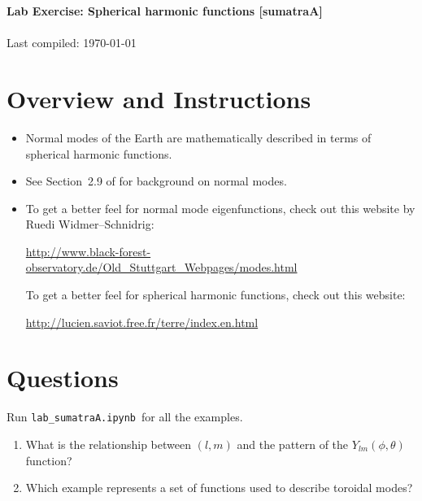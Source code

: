 \documentclass[11pt,titlepage,fleqn]{article}
\newcommand{\tfile}{{\tt lab_sumatraA.ipynb}}
\begin{document}

\begin{spacing}{1.2} 
\centering
{\large \bf Lab Exercise: Spherical harmonic functions [sumatraA]} \\
\cltag\ \\
Last compiled: \today
\end{spacing}

\section{Overview and Instructions}

\begin{itemize}
\item Normal modes of the Earth are mathematically described in terms of spherical harmonic functions.

\item See Section~2.9 of \citet{SteinWysession} for background on normal modes.

\item To get a better feel for normal mode eigenfunctions, check out this website by Ruedi Widmer--Schnidrig:

\url{http://www.black-forest-observatory.de/Old_Stuttgart_Webpages/modes.html}

To get a better feel for spherical harmonic functions, check out this website:

\url{http://lucien.saviot.free.fr/terre/index.en.html}

\end{itemize}


\section{Questions}

Run \tfile\ for all the examples.

\begin{enumerate}
\item What is the relationship between $(l,m)$ and the pattern of the $Y_{lm}(\phi,\theta)$ function?

\vspace{1cm}

\item Which example represents a set of functions used to describe toroidal modes?

\vspace{1cm}

\end{enumerate}



\end{document}
